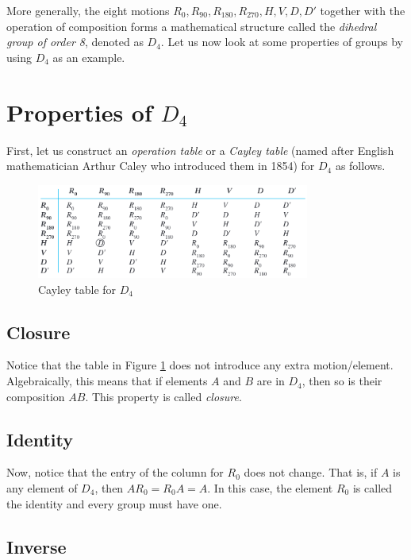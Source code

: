 More generally, the eight motions \(R_0, R_{90}, R_{180}, R_{270}, H, V, D, D'\) together with the operation of composition forms a mathematical structure called the \textit{dihedral group of order 8}, denoted as \(D_4\). Let us now look at some properties of groups by using \(D_4\) as an example.

\section{Properties of \(D_4\)}

First, let us construct an \textit{operation table} or a \textit{Cayley table} (named after English mathematician Arthur Caley who introduced them in 1854) for \(D_4\) as follows.

\begin{figure}[ht]
    \centering
    \includegraphics[width=0.8\textwidth]{images/ch1-cayley-table.png}
    \caption{Cayley table for \(D_4\)}
    \label{fig:cayleytable}
\end{figure}

\subsection{Closure}

Notice that the table in Figure \ref{fig:cayleytable} does not introduce any extra motion/element. Algebraically, this means that if elements \(A\) and \(B\) are in \(D_4\), then so is their composition \(AB\). This property is called \textit{closure}.

\subsection{Identity}

Now, notice that the entry of the column for \(R_0\) does not change. That is, if \(A\) is any element of \(D_4\), then \(AR_0 = R_0 A = A\). In this case, the element \(R_0\) is called the identity and every group must have one.

\subsection{Inverse}

